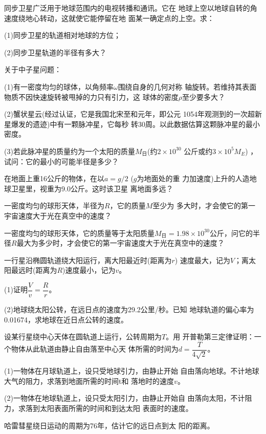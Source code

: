 \begin{exercises}
\exercise 同步卫星广泛用于地球范围内的电视转播和通讯。它在
地球上空以地球自转的角速度绕地心转动，这就使它能停留在地
面某一确定点的上空。求：

(1)同步卫星的轨道相对地球的方位；

(2)同步卫星轨道的半径有多大？

\exercise 关于中子星问题：

(1)有一密度均匀的球体，以角频率$ \omega $围绕自身的几何对称
轴旋转。若维持其表面物质不因快速旋转被甩掉的力只有引力，这
球体的密度$ \rho $至少要多大？

(2)蟹状星云(经过认证，它是我国北宋至和元年，即公元
1054年观测到的一次超新星爆发的遗迹)中有一颗脉冲星，它每秒
转30周。以此数据估算这颗脉冲星的最小密度。

(3)若此脉冲星的质量约为一个太阳的质量$ M _ \text{日} $(约$  2 \times 1 0 ^ { 3 0 }  $
公斤或约$  3 \times 1 0 ^ { 5 } M _ { E }  $)  ，试问：它的最小的可能半径是多少？

\exercise 在地面上重16公斤的物体，在以$  a = g / 2 $ ($ g $为地面处的重
力加速度)上升的人造地球卫星里，视重为9.0公斤。这时该卫星
离地面多远？

\exercise 一密度均匀的球形天体，半径为$ R $，它的质量$ M $至少为
多大时，才会使它的第一宇宙速度大于光在真空中的速度？

\exercise 一密度均匀的球形天体，它的质量等于太阳质量$ M _ \text{日} =
  1. 9 8 \times 1 0 ^ { 3 0 }  $公斤，问它的半径$ R $最大为多少时，才会使它的第一宇宙速度大于光在真空中的速度？

\exercise 一行星沿椭圆轨道绕大阳运行，离大阳最近时(距离为$ r $)
速度最大，记为$ V $；离太阳最远时(距离为$ R $)速度最小，记为$ v $。

(1)证明$ \dfrac { V } { v } = \dfrac { R } { r }   $。

(2)地球绕太阳公转，在远日点的速度为29.2公里/秒。已知
地球轨道的偏心率为0.01674，求地球在近日点公转的速度。

\exercise 设某行星绕中心天体在圆轨道上运行，公转周期为$ T $。用
开普勒第三定律证明：一个物体从此轨道由静止自由落至中心天
体所需的时间为$d = \dfrac { T } { 4 \sqrt { 2 } } $。

\exercise (1)一物体在月球轨道上，设只受地球引力，由静止开始
自由落向地球。不计地球大气的阻力，求落到地面所需的时间t和
落地时的速度$ v $。

\clearpage
(2)一物体在地球轨道上，设只受太阳引力，由静止开始自
由落向太阳，不计阻力，求落到太阳表面所需的时间和到达太阳
表面时的速度。

\exercise 哈雷彗星绕日运动的周期为76年，估计它的远日点到太
阳的距离。

\end{exercises}